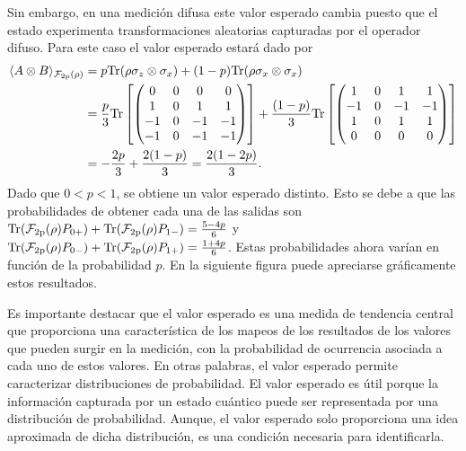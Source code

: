 Sin embargo, en una medición difusa este valor esperado cambia puesto que el estado experimenta transformaciones aleatorias capturadas por el operador difuso. Para este caso el valor esperado estará dado por \[\begin{split}\langle A\otimes B\rangle_{\mathcal{F}_{2\text{p}}(\rho)}&=p{\rm Tr}(\rho\sigma_z\otimes \sigma_x )+(1-p){\rm Tr}(\rho\sigma_x\otimes \sigma_x )\\
    & =\frac{p}{3}{\rm Tr}\left[ \begin{pmatrix}
        0&0&0&0\\
        1&0&1&1\\
        -1&0&-1&-1\\
        -1&0&-1&-1\\
    \end{pmatrix}\right]+ \frac{(1-p)}{3}{\rm Tr}\left[ \begin{pmatrix}
        1&0&1&1\\
        -1&0&-1&-1\\
        1&0&1&1\\
        0&0&0&0\\
    \end{pmatrix}\right]\\
    &=-\frac{2p}{3}+\frac{2(1-p)}{3}=\frac{2(1-2p)}{3}.
\end{split}\]Dado que $0<p<1$, se obtiene un valor esperado distinto. Esto se debe a que las probabilidades de obtener cada una de las salidas son ${\rm Tr}(\mathcal{F}_{2\text{p}}(\rho)P_{0+})+{\rm Tr}(\mathcal{F}_{2\text{p}}(\rho)P_{1-})=\frac{5-4p}{6}$ y ${\rm Tr}(\mathcal{F}_{2\text{p}}(\rho)P_{0-})+{\rm Tr}(\mathcal{F}_{2\text{p}}(\rho)P_{1+})=\frac{1+4p}{6}$. Estas probabilidades ahora varían en función de la probabilidad $p$. En la siguiente figura puede apreciarse gráficamente estos resultados.










Es importante destacar que el valor esperado es una medida de tendencia central que proporciona una característica de los mapeos de los resultados de los valores que pueden surgir en la medición, con la probabilidad de ocurrencia asociada a cada uno de estos valores. En otras palabras, el valor esperado permite caracterizar distribuciones de probabilidad. El valor esperado es útil porque la información capturada por un estado cuántico puede ser representada por una distribución de probabilidad. Aunque, el valor esperado solo proporciona una idea aproximada de dicha distribución, es una condición necesaria para identificarla. 

